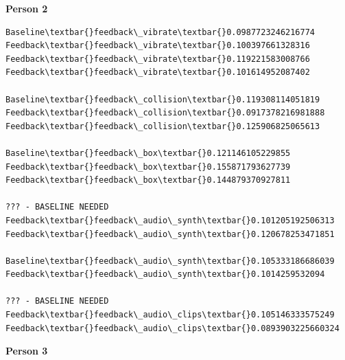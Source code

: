 \documentclass[a4paper,10pt,english,lof,lot,twoside]{puthesis}
\begin{document}
\textbf{Person 2}

\begin{Verbatim}[commandchars=\\\{\}]
Baseline\textbar{}feedback\_vibrate\textbar{}0.0987723246216774
Feedback\textbar{}feedback\_vibrate\textbar{}0.100397661328316
Feedback\textbar{}feedback\_vibrate\textbar{}0.119221583008766
Feedback\textbar{}feedback\_vibrate\textbar{}0.101614952087402

Baseline\textbar{}feedback\_collision\textbar{}0.119308114051819
Feedback\textbar{}feedback\_collision\textbar{}0.0917378216981888
Feedback\textbar{}feedback\_collision\textbar{}0.125906825065613

Baseline\textbar{}feedback\_box\textbar{}0.121146105229855
Feedback\textbar{}feedback\_box\textbar{}0.155871793627739
Feedback\textbar{}feedback\_box\textbar{}0.144879370927811

??? - BASELINE NEEDED
Feedback\textbar{}feedback\_audio\_synth\textbar{}0.101205192506313
Feedback\textbar{}feedback\_audio\_synth\textbar{}0.120678253471851

Baseline\textbar{}feedback\_audio\_synth\textbar{}0.105333186686039
Feedback\textbar{}feedback\_audio\_synth\textbar{}0.1014259532094

??? - BASELINE NEEDED
Feedback\textbar{}feedback\_audio\_clips\textbar{}0.105146333575249
Feedback\textbar{}feedback\_audio\_clips\textbar{}0.0893903225660324
\end{Verbatim}

\textbf{Person 3}
\end{document}
